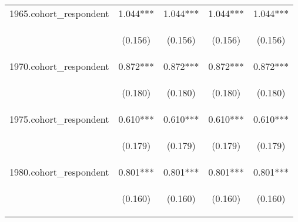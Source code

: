 \begin{center}
\begin{tabular}{lcccc}
1965.cohort\_respondent & 1.044*** & 1.044*** & 1.044*** & 1.044*** \\
\vspace{4pt} & \begin{footnotesize}(0.156)\end{footnotesize} & \begin{footnotesize}(0.156)\end{footnotesize} & \begin{footnotesize}(0.156)\end{footnotesize} & \begin{footnotesize}(0.156)\end{footnotesize} \\
1970.cohort\_respondent & 0.872*** & 0.872*** & 0.872*** & 0.872*** \\
\vspace{4pt} & \begin{footnotesize}(0.180)\end{footnotesize} & \begin{footnotesize}(0.180)\end{footnotesize} & \begin{footnotesize}(0.180)\end{footnotesize} & \begin{footnotesize}(0.180)\end{footnotesize} \\
1975.cohort\_respondent & 0.610*** & 0.610*** & 0.610*** & 0.610*** \\
\vspace{4pt} & \begin{footnotesize}(0.179)\end{footnotesize} & \begin{footnotesize}(0.179)\end{footnotesize} & \begin{footnotesize}(0.179)\end{footnotesize} & \begin{footnotesize}(0.179)\end{footnotesize} \\
1980.cohort\_respondent & 0.801*** & 0.801*** & 0.801*** & 0.801*** \\
\vspace{4pt} & \begin{footnotesize}(0.160)\end{footnotesize} & \begin{footnotesize}(0.160)\end{footnotesize} & \begin{footnotesize}(0.160)\end{footnotesize} & \begin{footnotesize}(0.160)\end{footnotesize} \\

\end{tabular}
\end{center}
